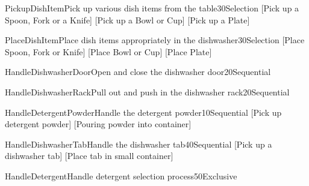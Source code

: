 
\begin{Group}{PickupDishItem}{Pick up various dish items from the table}{30}{Selection}
    [Pick up a Spoon, Fork or a Knife]
    [Pick up a Bowl or Cup]
    [Pick up a Plate]
\end{Group}

\begin{Group}{PlaceDishItem}{Place dish items appropriately in the dishwasher}{30}{Selection}
    [Place Spoon, Fork or Knife]
    [Place Bowl or Cup]
    [Place Plate]
\end{Group}

\begin{Group}{HandleDishwasherDoor}{Open and close the dishwasher door}{20}{Sequential}
\end{Group}

\begin{Group}{HandleDishwasherRack}{Pull out and push in the dishwasher rack}{20}{Sequential}
\end{Group}

\begin{Group}{HandleDetergentPowder}{Handle the detergent powder}{10}{Sequential}
    [Pick up detergent powder]
    [Pouring powder into container]
\end{Group}

\begin{Group}{HandleDishwasherTab}{Handle the dishwasher tab}{40}{Sequential}
    [Pick up a dishwasher tab]
    [Place tab in small container]
\end{Group}

\begin{Group}{HandleDetergent}{Handle detergent selection process}{50}{Exclusive}
\end{Group}

